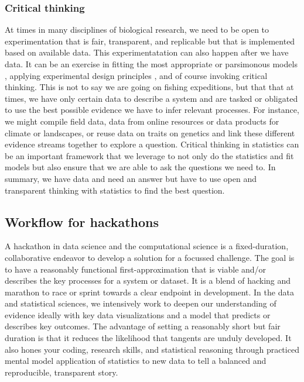 \documentclass[
]{book}
\begin{document}
\hypertarget{critical-thinking-5}{%
\subsubsection*{Critical thinking}\label{critical-thinking-5}}

At times in many disciplines of biological research, we need to be open to experimentation that is fair, transparent, and replicable but that is implemented based on available data. This experimentatation can also happen after we have data. It can be an exercise in fitting the most appropriate or parsimonous models \citep{RN1873}, applying experimental design principles \citep{RN6381}, and of course invoking critical thinking. This is not to say we are going on fishing expeditions, but that that at times, we have only certain data to describe a system and are tasked or obligated to use the best possible evidence we have to infer relevant processes. For instance, we might compile field data, data from online resources or data products for climate or landscapes, or reuse data on traits on genetics and link these different evidence streams together to explore a question. Critical thinking in statistics can be an important framework that we leverage to not only do the statistics and fit models but also ensure that we are able to ask the questions we need to. In summary, we have data and need an answer but have to use open and transparent thinking with statistics to find the best question.

\hypertarget{workflow-for-hackathons}{%
\subsection*{Workflow for hackathons}\label{workflow-for-hackathons}}

A hackathon in data science and the computational science is a fixed-duration, collaborative endeavor to develop a solution for a focussed challenge. The goal is to have a reasonably functional first-approximation that is viable and/or describes the key processes for a system or dataset. It is a blend of hacking and marathon to race or sprint towards a clear endpoint in development. In the data and statistical sciences, we intensively work to deepen our understanding of evidence ideally with key data visualizations and a model that predicts or describes key outcomes. The advantage of setting a reasonably short but fair duration is that it reduces the likelihood that tangents are unduly developed. It also hones your coding, research skills, and statistical reasoning through practiced mental model application of statistics to new data to tell a balanced and reproducible, transparent story.
\end{document}
